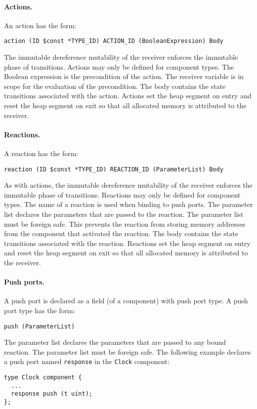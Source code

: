 \paragraph{Actions.}
An action has the form:
\begin{verbatim}
action (ID $const *TYPE_ID) ACTION_ID (BooleanExpression) Body
\end{verbatim}
The immutable dereference mutability of the receiver enforces the immutable phase of transitions.
Actions may only be defined for component types.
The Boolean expression is the precondition of the action.
The receiver variable is in scope for the evaluation of the precondition.
The body contains the state transitions associated with the action.
Actions set the heap segment on entry and reset the heap segment on exit so that all allocated memory is attributed to the receiver.

\paragraph{Reactions.}
A reaction has the form:
\begin{verbatim}
reaction (ID $const *TYPE_ID) REACTION_ID (ParameterList) Body
\end{verbatim}
As with actions, the immutable dereference mutability of the receiver enforces the immutable phase of transitions.
Reactions may only be defined for component types.
The name of a reaction is used when binding to push ports.
The parameter list declares the parameters that are passed to the reaction.
The parameter list must be foreign safe.
This prevents the reaction from storing memory addresses from the component that activated the reaction.
The body contains the state transitions associated with the reaction.
Reactions set the heap segment on entry and reset the heap segment on exit so that all allocated memory is attributed to the receiver.

\paragraph{Push ports.}
A push port is declared as a field (of a component) with push port type.
A push port type has the form:
\begin{verbatim}
push (ParameterList)
\end{verbatim}
The parameter list declares the parameters that are passed to any bound reaction.
The parameter list must be foreign safe.
The following example declares a push port named \verb+response+ in the \verb+Clock+ component:
\begin{verbatim}
type Clock component {
  ...
  response push (t uint);
};
\end{verbatim}

